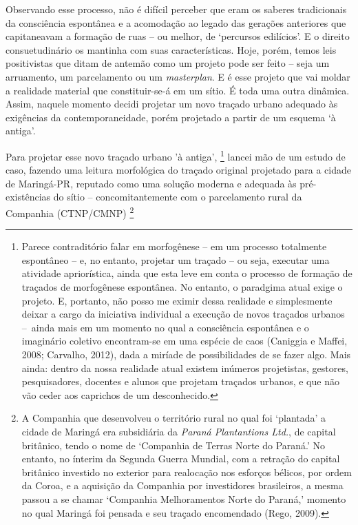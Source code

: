 \documentclass[]{report}
\begin{document}
	Observando esse processo, não é difícil perceber que eram os saberes tradicionais da consciência espontânea e a acomodação ao legado das gerações anteriores que capitaneavam a formação de ruas – ou melhor, de `percursos edilícios'. E o direito consuetudinário os mantinha com suas características. Hoje, porém, temos leis positivistas que ditam de antemão como um projeto pode ser feito – seja um arruamento, um parcelamento ou um \textit{masterplan}. E é esse projeto que vai moldar a realidade material que constituir-se-á em um sítio. É toda uma outra dinâmica. Assim, naquele momento decidi projetar um novo traçado urbano adequado às exigências da contemporaneidade, porém projetado a partir de um esquema `à antiga'.

	Para projetar esse novo traçado urbano 'à antiga',
		\footnote[2]{Parece contraditório falar em morfogênese – em um processo totalmente espontâneo – e, no entanto, projetar um traçado – ou seja, executar uma atividade apriorística, ainda que esta leve em conta o processo de formação de traçados de morfogênese espontânea. No entanto, o paradgima atual exige o projeto. E, portanto, não posso me eximir dessa realidade e simplesmente deixar a cargo da iniciativa individual a execução de novos traçados urbanos – ainda mais em um momento no qual a consciência espontânea e o imaginário coletivo encontram-se em uma espécie de caos (Caniggia e Maffei, 2008; Carvalho, 2012), dada a miríade de possibilidades de se fazer algo. Mais ainda: dentro da nossa realidade atual existem inúmeros projetistas, gestores, pesquisadores, docentes e alunos que projetam traçados urbanos, e que não vão ceder aos caprichos de um desconhecido.} 
	lancei mão de um estudo de caso, fazendo uma leitura morfológica do traçado original projetado para a cidade de Maringá-PR, reputado como uma solução moderna e adequada às pré-existências do sítio – concomitantemente com o parcelamento rural da Companhia (CTNP/CMNP)
		\footnote[3]{A Companhia que desenvolveu o território rural no qual foi `plantada' a cidade de Maringá era subsidiária da \textit{Paraná Plantantions Ltd.}, de capital britânico, tendo o nome de `Companhia de Terras Norte do Paraná.' No entanto, no ínterim da Segunda Guerra Mundial, com a retração do capital britânico investido no exterior para realocação nos esforços bélicos, por ordem da Coroa, e a aquisição da Companhia por investidores brasileiros, a mesma passou a se chamar `Companhia Melhoramentos Norte do Paraná,' momento no qual Maringá foi pensada e seu traçado encomendado (Rego, 2009).} 
\end{document}
